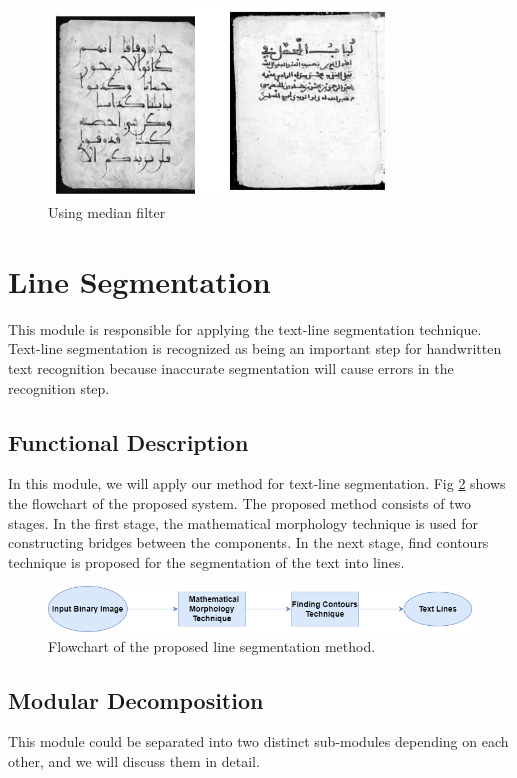 \begin{itemize}[labelindent=1em,labelsep=0.25cm,leftmargin=*]
        \begin{figure}[!htb]
            \centering
            \includegraphics[width=9cm]{images/afmedian.png}
            \caption{Using median filter}
            \label{fig:afmed}
        \end{figure}
    \end{itemize}

\section{Line Segmentation}
This module is responsible for applying the text-line segmentation technique. Text-line segmentation is recognized as being an important step for handwritten text recognition because inaccurate segmentation will cause errors in the recognition step. %

\subsection{Functional Description}
In this module, we will apply our method for text-line segmentation. Fig \ref{fig:flow_line} shows the flowchart of the proposed system. The proposed method consists of two stages. In the first stage, the mathematical morphology technique is used for constructing bridges between the components. In the next stage, find contours technique is proposed for the segmentation of the text into lines.
        \begin{figure}[!htb]
            \centering
            \includegraphics[width=14cm]{images/flowchart_line_segmentation.png}
            \caption{Flowchart of the proposed line segmentation method. }
            \label{fig:flow_line}
        \end{figure}
\subsection{Modular Decomposition}
This module could be separated into two distinct sub-modules depending on each other, and we will discuss them in detail. %


